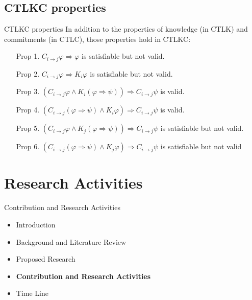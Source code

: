 \documentclass{beamer}
\begin{document}
\subsection{CTLKC properties}
\begin{frame}{CTLKC properties}
In addition to the properties of knowledge (in CTLK) and commitments (in CTLC), those properties hold in CTLKC:
\begin{enumerate}

\vspace{0.2cm} \item [Prop 1.] $C_{i \rightarrow j}\varphi
\Rightarrow \varphi$ is satisfiable but not valid.
\vspace{0.2cm} \item [Prop 2.] $C_{i \rightarrow j}\varphi
\Rightarrow K_i \varphi$ is satisfiable but not valid.
\vspace{0.2cm} \item [Prop 3.] $(C_{i \rightarrow j}\varphi \wedge
K_i (\varphi \Rightarrow \psi)) \Rightarrow C_{i \rightarrow j}
\psi$ is valid.
\vspace{0.2cm} \item [Prop 4.] $(C_{i \rightarrow j}(\varphi
\Rightarrow \psi) \wedge K_i \varphi) \Rightarrow C_{i \rightarrow
j} \psi$ is valid.
\vspace{0.2cm} \item [Prop 5.] $(C_{i \rightarrow j}\varphi \wedge
K_j (\varphi \Rightarrow \psi)) \Rightarrow C_{i \rightarrow j}
\psi$ is satisfiable but not valid.
\vspace{0.2cm} \item [Prop 6.] $(C_{i \rightarrow j}(\varphi
\Rightarrow \psi) \wedge K_j \varphi) \Rightarrow C_{i \rightarrow
j} \psi$ is satisfiable but not valid

\end{enumerate}
\end{frame}

\section{Research Activities}
\begin{frame}{Contribution and Research Activities}
    \begin{itemize}
     	\itemsep=.5cm
    	\item Introduction
    	\item Background and Literature Review
    	\item Proposed Research
        \item {\bf Contribution and Research Activities}
    	\item Time Line
    \end{itemize}
\end{frame}
\end{document}
